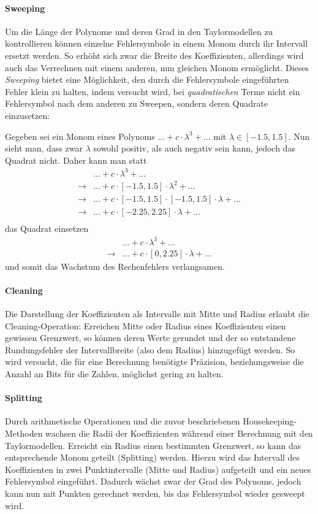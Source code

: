 \paragraph{Sweeping}
Um die Länge der Polynome und deren Grad in den Taylormodellen zu kontrollieren können einzelne 
Fehlersymbole in einem Monom durch ihr Intervall ersetzt werden. So erhöht sich zwar die Breite des 
Koeffizienten, allerdings wird auch das Verrechnen mit einem anderen, nun gleichen Monom 
ermöglicht. Dieses \textit{Sweeping} bietet eine Möglichkeit, den durch die 
Fehlersymbole eingeführten Fehler klein zu halten, indem versucht wird, bei
\textit{quadratischen} Terme nicht ein Fehlersymbol nach dem anderen zu Sweepen, sondern deren 
Quadrate einzusetzen: \par
Gegeben sei ein Monom eines Polynoms $...+ c \cdot \lambda^3 + ...$ mit $\lambda \in [-1.5, 1.5]$. Nun sieht man, dass zwar $\lambda$ sowohl positiv, als auch negativ sein kann, jedoch das Quadrat nicht. Daher kann man statt
\begin{align*}
    & ... + c \cdot \lambda^3 + ... \\
    \rightarrow & ...+ c \cdot [-1.5, 1.5] \cdot \lambda^2  +... \\
    \rightarrow & ...+ c \cdot [-1.5, 1.5] \cdot [-1.5, 1.5] \cdot \lambda +... \\
    \rightarrow & ...+ c \cdot [-2.25, 2.25] \cdot \lambda+... \\
\end{align*}
das Quadrat einsetzen
\begin{align*}
    & ... + c \cdot \lambda^3 + ... \\
    \rightarrow & ...+ c \cdot [0, 2.25] \cdot \lambda +...
\end{align*}
und somit das Wachstum des Rechenfehlers verlangsamen. 

\paragraph{Cleaning}
Die Darstellung der Koeffizienten als Intervalle mit Mitte und Radius erlaubt die Cleaning-Operation: Erreichen Mitte oder Radius eines Koeffizienten einen gewissen Grenzwert, so können deren Werte gerundet und der so entstandene Rundungsfehler der Intervallbreite (also dem Radius) hinzugefügt werden. So wird versucht, die für eine Berechnung benötigte Präzision, beziehungsweise die Anzahl an Bits für die Zahlen, möglichst gering zu halten.


\paragraph{Splitting}
Durch arithmetische Operationen und die zuvor beschriebenen Housekeeping-Methoden wachsen die Radii der Koeffizienten während einer Berechnung mit den Taylormodellen. Erreicht ein Radius einen bestimmten Grenzwert, so kann das entsprechende Monom geteilt (Splitting) werden. Hierzu wird das Intervall des Koeffizienten in zwei Punktintervalle (Mitte und Radius) aufgeteilt und ein neues Fehlersymbol eingeführt. Dadurch wächst zwar der Grad des Polynoms, jedoch kann nun mit Punkten gerechnet werden, bis das Fehlersymbol wieder gesweept wird. 


